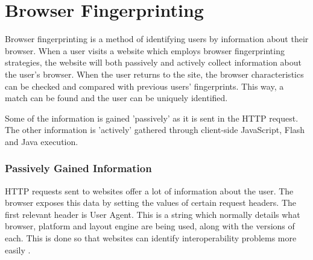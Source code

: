 \chapter{Browser Fingerprinting}

Browser fingerprinting is a method of identifying users by information about their browser.
When a user visits a website which employs browser fingerprinting strategies, the website will both passively and actively collect information about the user's browser.
When the user returns to the site, the browser characteristics can be checked and compared with previous users' fingerprints.
This way, a match can be found and the user can be uniquely identified.

Some of the information is gained 'passively' as it is sent in the HTTP request.
The other information is 'actively' gathered through client-side JavaScript, Flash and Java execution.

\subsection{Passively Gained Information}

HTTP requests sent to websites offer a lot of information about the user.
The browser exposes this data by setting the values of certain request headers.
The first relevant header is User Agent.
This is a string which normally details what browser, platform and layout engine are being used, along with the versions of each.
This is done so that websites can identify interoperability problems more easily \citep{useragent}.

